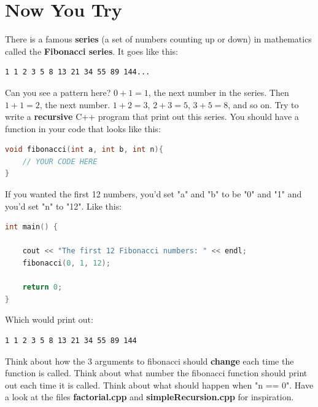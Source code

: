 \documentclass[a4paper,12pt]{article} %
\begin{document}
\section{Now You Try}

There is a famous \textbf{series} (a set of numbers counting up or down) in mathematics called the \textbf{Fibonacci series}. It goes like this:

\begin{verbatim}
1 1 2 3 5 8 13 21 34 55 89 144...
\end{verbatim}

\noindent
Can you see a pattern here? $0+1 = 1$, the next number in the series. Then $1+1 = 2$, the next number. $1 + 2 = 3$, $2 + 3 = 5$, $3 + 5 = 8$, and so on. Try to write a \textbf{recursive} C++ program that print out this series. You should have a function in your code that looks like this:

\vspace{5mm}
\begin{lstlisting}[language=C++]
void fibonacci(int a, int b, int n){
	// YOUR CODE HERE
}
 \end{lstlisting}
 
 \noindent
 If you wanted the first 12 numbers, you'd set "a" and "b" to be "0" and "1" and you'd set "n" to "12". Like this:
 
 \vspace{5mm}
\begin{lstlisting}[language=C++]
 int main() {

    cout << "The first 12 Fibonacci numbers: " << endl;
    fibonacci(0, 1, 12);
    
    return 0;
}
 \end{lstlisting}

\noindent
Which would print out:

\begin{verbatim}
1 1 2 3 5 8 13 21 34 55 89 144
\end{verbatim}

\noindent
Think about how the 3 arguments to fibonacci should \textbf{change} each time the function is called. Think about what number the fibonacci function should print out each time it is called. Think about what should happen when "n == 0". Have a look at the files \textbf{factorial.cpp} and \textbf{simpleRecursion.cpp} for inspiration.
\end{document}
